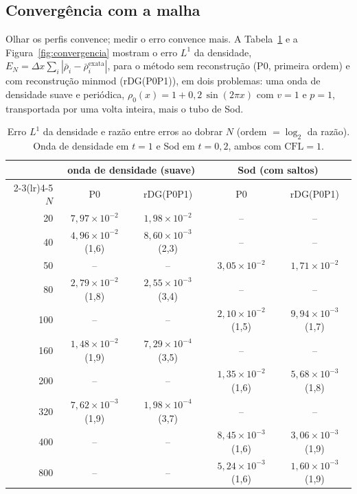 \documentclass[10pt,a4paper]{article}
\begin{document}
\subsection{Convergência com a malha}

Olhar os perfis convence; medir o erro convence mais. A Tabela~\ref{tab:conv} e a Figura~\ref{fig:convergencia} mostram o erro $L^1$ da densidade, $E_N=\Delta x\sum_i|\bar\rho_i-\bar\rho_i^{\text{exata}}|$, para o método sem reconstrução (P0, primeira ordem) e com reconstrução minmod (rDG(P0P1)), em dois problemas: uma onda de densidade suave e periódica, $\rho_0(x)=1+0{,}2\,\sin(2\pi x)$ com $v=1$ e $p=1$, transportada por uma volta inteira, mais o tubo de Sod.

\begin{table}[htbp]
\centering\small
\caption{Erro $L^1$ da densidade e razão entre erros ao dobrar $N$ (ordem $=\log_2$ da razão). Onda de densidade em $t=1$ e Sod em $t=0{,}2$, ambos com $\mathrm{CFL}=1$.}
\label{tab:conv}
\begin{tabular}{@{}r cc cc@{}}
\toprule
& \multicolumn{2}{c}{onda de densidade (suave)} & \multicolumn{2}{c}{Sod (com saltos)}\\
\cmidrule(lr){2-3}\cmidrule(lr){4-5}
$N$ & P0 & rDG(P0P1) & P0 & rDG(P0P1)\\
\midrule
20  & $7{,}97\times10^{-2}$ & $1{,}98\times10^{-2}$ & -- & --\\
40  & $4{,}96\times10^{-2}$ (1,6) & $8{,}60\times10^{-3}$ (2,3) & -- & --\\
50  & -- & -- & $3{,}05\times10^{-2}$ & $1{,}71\times10^{-2}$\\
80  & $2{,}79\times10^{-2}$ (1,8) & $2{,}55\times10^{-3}$ (3,4) & -- & --\\
100 & -- & -- & $2{,}10\times10^{-2}$ (1,5) & $9{,}94\times10^{-3}$ (1,7)\\
160 & $1{,}48\times10^{-2}$ (1,9) & $7{,}29\times10^{-4}$ (3,5) & -- & --\\
200 & -- & -- & $1{,}35\times10^{-2}$ (1,6) & $5{,}68\times10^{-3}$ (1,8)\\
320 & $7{,}62\times10^{-3}$ (1,9) & $1{,}98\times10^{-4}$ (3,7) & -- & --\\
400 & -- & -- & $8{,}45\times10^{-3}$ (1,6) & $3{,}06\times10^{-3}$ (1,9)\\
800 & -- & -- & $5{,}24\times10^{-3}$ (1,6) & $1{,}60\times10^{-3}$ (1,9)\\
\bottomrule
\end{tabular}
\end{table}
\end{document}
